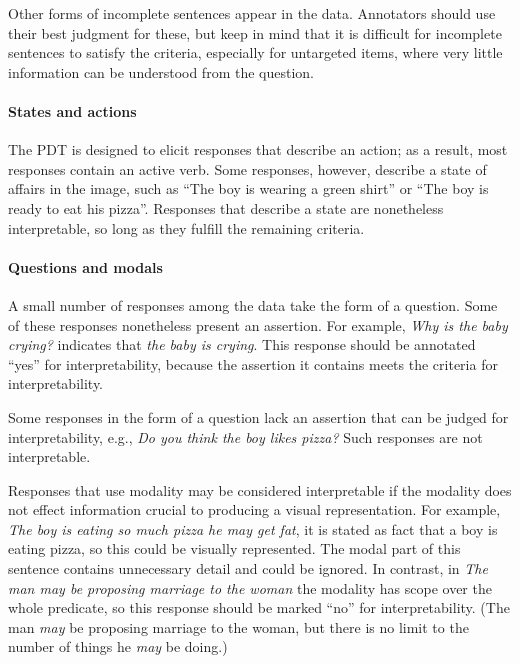 \documentclass[12pt,notitlepage]{article}
\begin{document}
Other forms of incomplete sentences appear in the data. Annotators should use their best judgment for these, but keep in mind that it is difficult for incomplete sentences to satisfy the criteria, especially for untargeted items, where very little information can be understood from the question.

\paragraph{States and actions} \label{para:interp-question} The PDT is designed to elicit responses that describe an action; as a result, most responses contain an active verb. Some responses, however, describe a state of affairs in the image, such as ``The boy is wearing a green shirt'' or ``The boy is ready to eat his pizza''. Responses that describe a state are nonetheless interpretable, so long as they fulfill the remaining criteria.

\paragraph{Questions and modals} \label{para:interp-question} A small number of responses among the data take the form of a question. Some of these responses nonetheless present an assertion. For example, \textit{Why is the baby crying?} indicates that \textit{the baby is crying}. This response should be annotated ``yes'' for interpretability, because the assertion it contains meets the criteria for interpretability.

Some responses in the form of a question lack an assertion that can be judged for interpretability, e.g., \textit{Do you think the boy likes pizza?} Such responses are not interpretable.

Responses that use modality may be considered interpretable if the modality does not effect information crucial to producing a visual representation. For example, \textit{The boy is eating so much pizza he may get fat}, it is stated as fact that a boy is eating pizza, so this could be visually represented. The modal part of this sentence contains unnecessary detail and could be ignored. In contrast, in \textit{The man may be proposing marriage to the woman} the modality has scope over the whole predicate, so this response should be marked ``no'' for interpretability. (The man \textit{may} be proposing marriage to the woman, but there is no limit to the number of things he \textit{may} be doing.)
\end{document}
